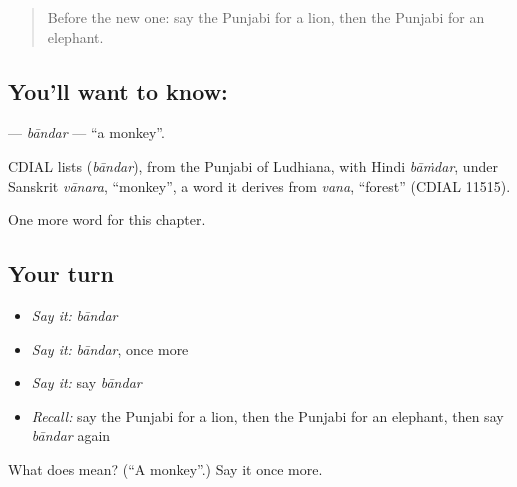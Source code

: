 \label{lesson:PA-C78-bandar}



\begin{quote}
Before the new one: say the Punjabi for a lion, then the Punjabi for an elephant.
\end{quote}

\subsection*{You'll want to know: }
\textbf{} — \emph{bāndar} — \textquotedblleft{}a monkey\textquotedblright{}.

\begin{cousinweb}
CDIAL lists \textbf{} (\emph{bāndar}), from the Punjabi of Ludhiana, with Hindi \emph{bāṁdar}, under Sanskrit \emph{vānara}, \textquotedblleft{}monkey\textquotedblright{}, a word it derives from \emph{vana}, \textquotedblleft{}forest\textquotedblright{} (CDIAL 11515).
\end{cousinweb}

\begin{grammarlens}[title={What you've built}]
One more word for this chapter.
\end{grammarlens}

\subsection*{Your turn}
\begin{itemize}
\raggedright
  \item \emph{Say it:} \emph{bāndar}
  \item \emph{Say it:} \emph{bāndar}, once more
  \item \emph{Say it:} say \emph{bāndar}
  \item \emph{Recall:} say the Punjabi for a lion, then the Punjabi for an elephant, then say \emph{bāndar} again
\end{itemize}

\begin{tcolorbox}[breakable,colback=teal!4,colframe=teal!35!black,title={Before you move on}]
What does  mean? (\textquotedblleft{}A monkey\textquotedblright{}.) Say it once more.
\end{tcolorbox}
